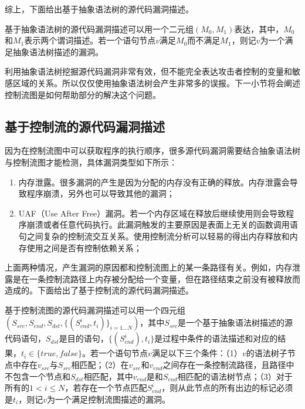 综上，下面给出基于抽象语法树的源代码漏洞描述。

\begin{definition}
\label{基于抽象语法树的源代码漏洞描述}
基于抽象语法树的源代码漏洞描述可以用一个二元组$(M_0,M_1)$表达，其中，$M_0$和$M_1$表示两个谓词描述。若一个语句节点$v$满足$M_0$而不满足$M_1$，则记$v$为一个满足抽象语法树描述的漏洞。
\end{definition}

利用抽象语法树挖掘源代码漏洞非常有效，但不能完全表达攻击者控制的变量和敏感区域的关系。所以仅仅使用抽象语法树会产生非常多的误报。下一小节将会阐述控制流图是如何帮助部分的解决这个问题。

\subsection{基于控制流的源代码漏洞描述}

因为在控制流图中可以获取程序的执行顺序，很多源代码漏洞需要结合抽象语法树与控制流图才能检测，具体漏洞类型如下所示：

\begin{enumerate}[(1)]
\item 内存泄露。很多漏洞的产生是因为分配的内存没有正确的释放。内存泄露会导致程序崩溃，另外也可以导致其他的漏洞；
\item UAF（Use After Free）漏洞。若一个内存区域在释放后继续使用则会导致程序崩溃或者任意代码执行。此漏洞触发的主要原因是表面上无关的函数调用语句之间复杂的控制流交互关系。使用控制流分析可以轻易的得出内存释放和内存使用之间是否有控制依赖关系；
\end{enumerate}
上面两种情况，产生漏洞的原因都和控制流图上的某一条路径有关。例如，内存泄露是在一条控制流路径上内存被分配给一个变量，但在路径结束之前没有被释放而造成的。下面给出了基于控制流的源代码漏洞描述。

\begin{definition}
基于控制流图的源代码漏洞描述可以用一个四元组\\$(S_{src},S_{end},S_{dst},\{(S^{i}_{cnd},t_i)\}_{i=1...N})$，其中$S_{src}$是一个基于抽象语法树描述的源代码语句，$S_{dst}$是目的语句，$\{(S^{i}_{cnd}),t_i\}$是过程中条件的语法描述和对应的结果，$t_i \in \{true, false\}$。若一个语句节点$v$满足以下三个条件：（1）$v$的语法树子节点中存在$v_{src}$与$S_{src}$相匹配；（2）在$v_{src}$和$v_{end}$之间存在一条控制流路径，且路径中不包含一个节点和$S_{dst}$相匹配，其中$v_{end}$是和$S_{end}$相匹配的语法树节点；（3）对于所有的$1< i \leq N$，若存在一个节点匹配$S^{i}_{end}$，则从此节点的所有出边的标记必须是$t_i$，则记$v$为一个满足控制流图描述的漏洞。
\end{definition}

